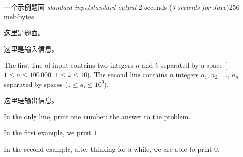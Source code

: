 \gdef\thisproblemauthor{示例作者}
\gdef\thisproblemdeveloper{Ivan Kazmenko}
\gdef\thisproblemorigin{\texttt{XXXIII} St. Petersburg State University Championship}
\begin{problem}{一个示例题面}
{\textsl{standard input}}{\textsl{standard output}}
{2 seconds (\textsl{3 seconds for Java})}{256 mebibytes}{}

这里是题面。

\InputFile

这里是输入信息。

The first line of input contains two integers $n$ and $k$ separated by a space
($1 \le n \le 100\,000$, $1 \le k \le 10$).
The second line contains $n$ integers
$a_1$, $a_2$, $\ldots$, $a_n$ separated by spaces
($1 \le a_i \le 10^9$).

\OutputFile

这里是输出信息。

In the only line, print one number: the answer to the problem.

\Examples

\begin{example}
%
%
\end{example}

\begin{example}
%
\end{example}

\begin{examplewide}
%
\end{examplewide}

\begin{examplethree}
%
\end{examplethree}

\Explanations

In the first example, we print $1$.

In the second example, after thinking for a while, we are able to print $0$.

\end{problem}
